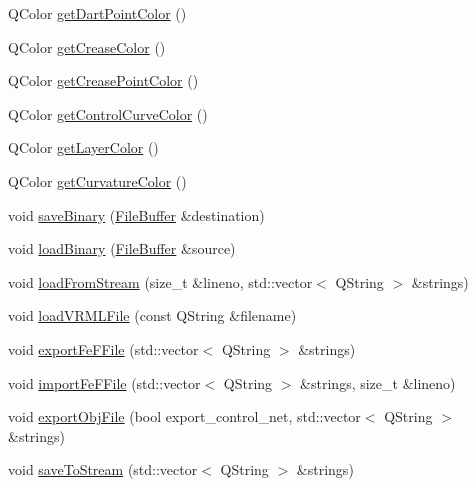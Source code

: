 \begin{DoxyCompactItemize}
Q\-Color \hyperlink{classShipCADGeometry_1_1SubdivisionSurface_ad8726fdbb7089c8a2fa8306abccfec18}{get\-Dart\-Point\-Color} ()
\item 
Q\-Color \hyperlink{classShipCADGeometry_1_1SubdivisionSurface_a71f7f105790c4cdaf44a132c602fde34}{get\-Crease\-Color} ()
\item 
Q\-Color \hyperlink{classShipCADGeometry_1_1SubdivisionSurface_a86bb08b5eff00deb3fa597b3272d99f1}{get\-Crease\-Point\-Color} ()
\item 
Q\-Color \hyperlink{classShipCADGeometry_1_1SubdivisionSurface_a12e3f89533293e2ca2dfa1ec4fa4cb71}{get\-Control\-Curve\-Color} ()
\item 
Q\-Color \hyperlink{classShipCADGeometry_1_1SubdivisionSurface_ade918dfa52fb1254e4c3808639ee11c3}{get\-Layer\-Color} ()
\item 
Q\-Color \hyperlink{classShipCADGeometry_1_1SubdivisionSurface_a4b84d7479369659b284af39f8bb36909}{get\-Curvature\-Color} ()
\item 
void \hyperlink{classShipCADGeometry_1_1SubdivisionSurface_a6e6254ecc6fcbdadf1ff4f646caa1d59}{save\-Binary} (\hyperlink{classShipCADGeometry_1_1FileBuffer}{File\-Buffer} \&destination)
\item 
void \hyperlink{classShipCADGeometry_1_1SubdivisionSurface_ac8ad644e0c19ac180fd4a7368fa410a6}{load\-Binary} (\hyperlink{classShipCADGeometry_1_1FileBuffer}{File\-Buffer} \&source)
\item 
void \hyperlink{classShipCADGeometry_1_1SubdivisionSurface_a489eed6508bb376170fa7926d2b7dc10}{load\-From\-Stream} (size\-\_\-t \&lineno, std\-::vector$<$ Q\-String $>$ \&strings)
\item 
void \hyperlink{classShipCADGeometry_1_1SubdivisionSurface_a183437fe2ac34285846224c7c1bba01b}{load\-V\-R\-M\-L\-File} (const Q\-String \&filename)
\item 
void \hyperlink{classShipCADGeometry_1_1SubdivisionSurface_a958a2af5d8d06ccf1aa3ac4e812cb1be}{export\-Fe\-F\-File} (std\-::vector$<$ Q\-String $>$ \&strings)
\item 
void \hyperlink{classShipCADGeometry_1_1SubdivisionSurface_af5e99c578032b83916f5c06591cbf459}{import\-Fe\-F\-File} (std\-::vector$<$ Q\-String $>$ \&strings, size\-\_\-t \&lineno)
\item 
void \hyperlink{classShipCADGeometry_1_1SubdivisionSurface_ac6a4c0542b17b1b50edb57ea5c0f28ec}{export\-Obj\-File} (bool export\-\_\-control\-\_\-net, std\-::vector$<$ Q\-String $>$ \&strings)
\item 
void \hyperlink{classShipCADGeometry_1_1SubdivisionSurface_a51d2d07423cc53fc98012f07ed9525bc}{save\-To\-Stream} (std\-::vector$<$ Q\-String $>$ \&strings)

\end{DoxyCompactItemize}
